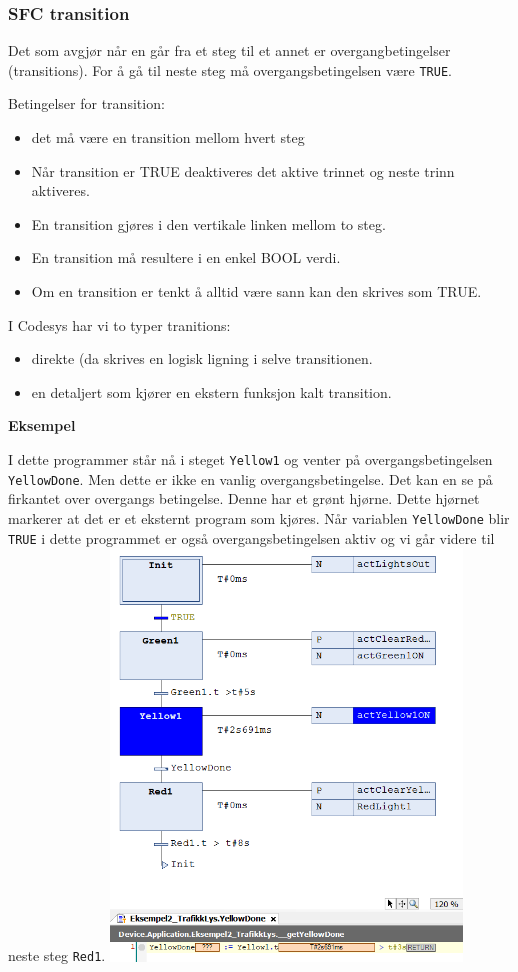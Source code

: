 \subsubsection{SFC transition}

Det som avgjør når en  går fra et steg til et annet er overgangbetingelser (transitions). For å gå til neste steg må overgangsbetingelsen være \verb|TRUE|.  

Betingelser for transition:
\begin{itemize}
\item det må være en transition mellom hvert steg
\item Når transition er TRUE deaktiveres det aktive trinnet og neste trinn aktiveres. 
\item En transition gjøres i den vertikale linken mellom to steg. 
\item En transition må resultere i en enkel BOOL verdi. 
\item Om en transition er tenkt å alltid være sann kan den skrives som TRUE. 
\end{itemize}
I Codesys har vi to typer tranitions:
\begin{itemize}
\item direkte (da skrives en logisk ligning i selve transitionen. 
\item en detaljert som kjører en ekstern funksjon kalt transition.
\end{itemize}
\textbf{Eksempel}

I dette programmer står nå i steget \verb|Yellow1| og venter på overgangsbetingelsen \verb|YellowDone|. Men dette er ikke en vanlig overgangsbetingelse. Det kan en se på firkantet over overgangs betingelse. Denne har et grønt hjørne. Dette hjørnet markerer at det er et eksternt program som kjøres. Når variablen \verb|YellowDone| blir \verb|TRUE| i dette programmet er også overgangsbetingelsen aktiv og vi går videre til neste steg \verb|Red1|.
\vskip 5pt 
\includegraphics[width=0.7\textwidth]{SFCTransitioneksempel.png}

